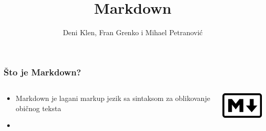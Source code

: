 \documentclass{beamer}
\begin{document}
\title{Markdown}
\author{Deni Klen, Fran Grenko i Mihael Petranović}
\maketitle

\begin{frame}
	\frametitle{Što je Markdown?}


	

 	\begin{minipage}[0.2\textheight]{\textwidth}
 	\begin{columns}[T]
 	\begin{column}{0.8\textwidth}
 	\begin{itemize}[<+->]
		\item{Markdown je lagani markup jezik sa sintaksom za oblikovanje običnog teksta}
		\item{}
	\end{itemize}
	\end{column}
	\begin{column}{0.2\textwidth}
	\includegraphics[width=2.5cm]{Slike/markdown.png}
	\end{column}
	\end{columns}
	\end{minipage}

\end{frame}
\end{document}
